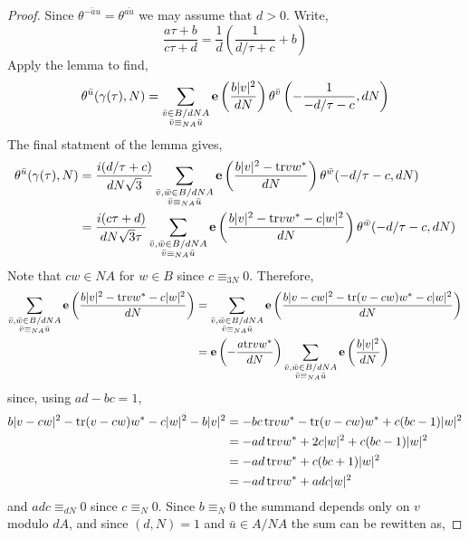 \documentclass{article}
\theoremstyle{definition}
\begin{document}
\begin{proof}
Since $\theta^{\bar{-au}} = \theta^{\bar{au}}$ we may assume that $d > 0$. Write,
\[ \frac{a \tau + b}{c \tau + d} = \frac{1}{d} \left( \frac{1}{d / \tau + c} + b \right) \]
Apply the lemma to find,
\[ \theta^{\bar{u}}(\gamma(\tau), N) = \sum_{\substack{\bar{v} \in B / d N A \\ \bar{v} \equiv_{NA} \bar{u}}} \mathbf{e}\left( \frac{b |v|^2}{d N} \right) \theta^{\bar{v}}\left( - \frac{1}{-d / \tau - c}, d N \right) \]
The final statment of the lemma gives,
\begin{align*}
\theta^{\bar{u}}(\gamma(\tau), N) & = \frac{i (d / \tau + c)}{d N \sqrt{3}} \sum_{\substack{\bar{v}, \bar{w} \in B / d NA \\ \bar{v} \equiv_{NA} \bar{u}}} \mathbf{e}\left(  \frac{b |v|^2 - \mathrm{tr}{vw^*}}{dN} \right) \theta^{\bar{w}}(-d / \tau - c, d N) 
\\
& = \frac{i (c \tau + d)}{d N \sqrt{3} \tau} \sum_{\substack{\bar{v}, \bar{w} \in B / d NA \\ \bar{v} \equiv_{NA} \bar{u}}} \mathbf{e}\left(  \frac{b |v|^2 - \mathrm{tr}{vw^*} - c |w|^2}{dN} \right) \theta^{\bar{w}}(-d / \tau - c, d N)
\end{align*}
Note that $c w \in NA$ for $w \in B$ since $c \equiv_{3N} 0$. Therefore,
\begin{align*}
\sum_{\substack{\bar{v}, \bar{w} \in B / d NA \\ \bar{v} \equiv_{NA} \bar{u}}} \mathbf{e}\left(  \frac{b |v|^2 - \mathrm{tr}{vw^*} - c |w|^2}{dN} \right) & = \sum_{\substack{\bar{v}, \bar{w} \in B / d NA \\ \bar{v} \equiv_{NA} \bar{u}}} \mathbf{e}\left(  \frac{b |v - cw|^2 - \mathrm{tr}{(v - cw)w^*} - c |w|^2}{dN} \right) 
\\
& = \mathbf{e}\left( -\frac{a \mathrm{tr}{v w^*}}{d N} \right) \sum_{\substack{\bar{v}, \bar{w} \in B / d NA \\ \bar{v} \equiv_{NA} \bar{u}}}  \mathbf{e}\left( \frac{b |v|^2}{dN} \right)
\end{align*}
since, using $ad - bc = 1$,
\begin{align*}
b |v - c w|^2 - \mathrm{tr}{(v - cw) w^*} - c|w|^2 - b |v|^2 & = - bc \, \mathrm{tr}{v w^*} - \mathrm{tr}{(v - cw) w^*} + c(bc - 1) |w|^2
\\
& = - ad \, \mathrm{tr}{v w^*} + 2 c |w|^2 + c(b c - 1) |w|^2
\\
& = - ad \, \mathrm{tr}{v w^*} + c(b c + 1) |w|^2
\\
& = - ad \, \mathrm{tr}{v w^*} + adc |w|^2
\end{align*}
and $adc \equiv_{dN} 0$ since $c \equiv_N 0$. Since $b \equiv_N 0$ the summand depends only on $v$ modulo $d A$, and since $(d, N) = 1$ and $\bar{u} \in A / NA$ the sum can be rewitten as,

\end{proof}
\end{document}
